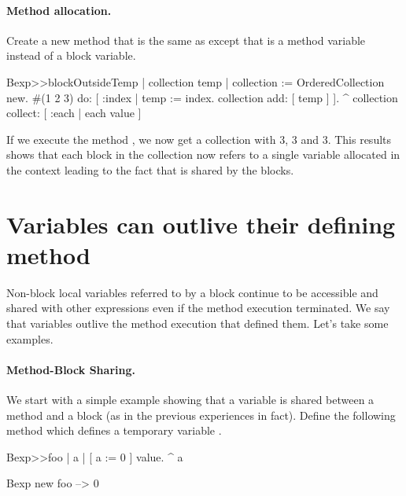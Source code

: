 \documentclass[a4paper,10pt,twoside]{book}
\begin{document}
\paragraph{Method allocation.} Create a new method that is the same as  except that  is a method variable instead of a block variable.

\begin{code}{}
Bexp>>blockOutsideTemp
	| collection temp |
	collection := OrderedCollection new.
	#(1 2 3) do: [ :index | 
		temp := index.
		collection add: [ temp ] ].
	^ collection collect: [ :each | each value ]
\end{code}

If we execute the method , we now get a collection with 3, 3 and 3. This results shows that each block in the collection now refers to a single variable  allocated in the  context leading to the fact that  is shared by the blocks.



\section{Variables can outlive their defining method}

Non-block local variables referred to by a block continue to be accessible and shared with other expressions even if the method execution terminated. We say that variables outlive the method execution that defined them.
Let's take some examples.

\paragraph{Method-Block Sharing.} We start with a simple example showing that a variable is shared between a method and a block (as in the previous experiences in fact). Define the following method  which defines a temporary variable .

\begin{code}{}
Bexp>>foo
	| a |
	[ a := 0 ] value.
	^ a
	
Bexp new foo
   --> 0	
\end{code}
\end{document}
